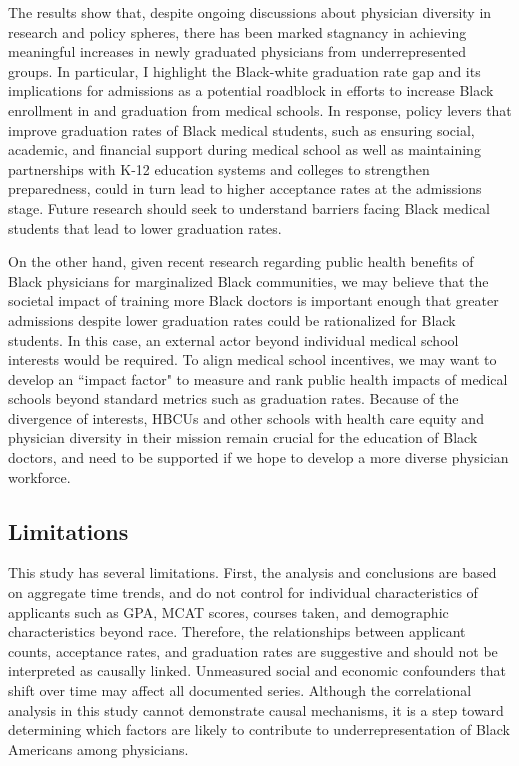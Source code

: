 \documentclass[12pt]{article}
\begin{document}
The results show that, despite ongoing discussions about physician diversity in research and policy spheres, there has been marked stagnancy in achieving meaningful increases in newly graduated physicians from underrepresented groups. In particular, I highlight the Black-white graduation rate gap and its implications for admissions as a potential roadblock in efforts to increase Black enrollment in and graduation from medical schools. In response, policy levers that improve graduation rates of Black medical students, such as ensuring social, academic, and financial support during medical school as well as maintaining partnerships with K-12 education systems and colleges to strengthen preparedness, could in turn lead to higher acceptance rates at the admissions stage. Future research should seek to understand barriers facing Black medical students that lead to lower graduation rates.

On the other hand, given recent research regarding public health benefits of Black physicians for marginalized Black communities, we may believe that the societal impact of training more Black doctors is important enough that greater admissions despite lower graduation rates could be rationalized for Black students. In this case, an external actor beyond individual medical school interests would be required. To align medical school incentives, we may want to develop an ``impact factor" to measure and rank public health impacts of medical schools beyond standard metrics such as graduation rates. Because of the divergence of interests, HBCUs and other schools with health care equity and physician diversity in their mission remain crucial for the education of Black doctors, and need to be supported if we hope to develop a more diverse physician workforce.


\subsection{Limitations}

This study has several limitations. First, the analysis and conclusions are based on aggregate time trends, and do not control for individual characteristics of applicants such as GPA, MCAT scores, courses taken, and demographic characteristics beyond race. Therefore, the relationships between applicant counts, acceptance rates, and graduation rates are suggestive and should not be interpreted as causally linked. Unmeasured social and economic confounders that shift over time may affect all documented series. Although the correlational analysis in this study cannot demonstrate causal mechanisms, it is a step toward determining which factors are likely to contribute to underrepresentation of Black Americans among physicians. 
\end{document}
